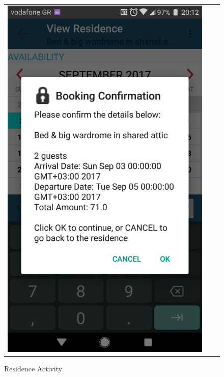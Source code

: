 \documentclass[12pt]{article}
\begin{document}
\begin{center}
\begin{figure}
\begin{tabular}{c c c }
				\includegraphics[scale=0.18, keepaspectratio]{11-bookConfirm.jpg}
				\\
			\end{tabular}
			\caption{Residence Activity}
		\end{figure}
	\end{center}
	
\end{document}
